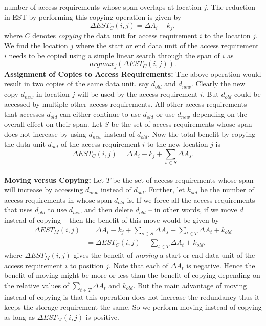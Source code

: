 number of access requirements whose span overlaps at location $j$.  The
reduction in EST by performing this copying operation is given by 
\[ 
\Delta EST_C(i,j) = \Delta A_i - k_j, 
\]
where $C$ denotes {\it copying} the data unit for access requirement $i$ to the location $j$. We find the location $j$ where the start or end data unit of the access requirement $i$ needs to be copied  using a simple linear search through the span of $i$ as
\[
argmax_j(\Delta EST_C(i,j)).
\]
{\bf Assignment of Copies to Access Requirements:} The above operation would
result in two copies of the same data unit, say $d_{old}$ and $d_{new}$.
Clearly the new copy $d_{new}$ in location $j$ will be used by the access
requirement $i$.  But $d_{old}$ could be accessed by multiple other access
requirements. All other access requirements that accesses $d_{old}$ can either
continue to use $d_{old}$ or use $d_{new}$ depending on the overall effect on
their span. Let $S$ be the set of access requirements whose span does not
increase by using $d_{new}$ instead of $d_{old}$. Now the total benefit by
copying the data unit $d_{old}$ of the access requirement $i$ to the new
location $j$ is
\begin{equation}
\Delta EST_C(i,j) = \Delta A_i - k_j + \sum_{s\in S}\Delta{A_s}.
\label{eq:copyingcost}
\end{equation}
\\
{\bf Moving versus Copying:} Let $T$ be the set of access requirements whose
span will increase by accessing $d_{new}$ instead of $d_{old}$. Further, let
$k_{old}$ be the number of access requirements in whose span $d_{old}$ is. If
we force all the access requirements that uses $d_{old}$ to use $d_{new}$ and
then delete $d_{old}$ -- in other words, if we move $d$ instead of copying --
then the benefit of this move would be given by
\[
\begin{split}
 \Delta EST_M(i,j) & = \Delta A_i - k_j + \sum_{s\in S}\Delta{A_s} + \sum_{t\in
T}\Delta{A_t} + k_{old} \\
		&= \Delta EST_C(i,j) + \sum_{t\in T}\Delta{A_t} + k_{old},
\end{split}
\]
where $\Delta EST_M(i,j)$ gives the benefit of {\it moving} a start or end data unit of the access requirement $i$ to position $j$. Note that each of $\Delta A_t$ is negative. Hence the benefit of moving might be more or less than the benefit of copying depending on the relative values of $\sum_{t\in T}\Delta{A_t}$ and $k_{old}$. But the main advantage of moving instead of copying is that this operation does not increase the redundancy thus it keeps the storage requirement the same. So we perform moving instead of copying as long as $\Delta EST_M(i,j)$ is positive.\\
